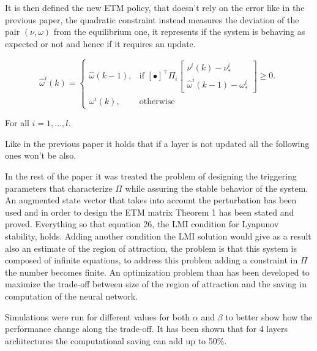 \documentclass[12pt]{article}
\begin{document}
It is then defined the new ETM policy, that doesn't rely on the error like in the previous paper, the quadratic constraint instead measures the deviation of the pair $(\nu, \omega)$ from the equilibrium one, it represents if the system is behaving as expected or not and hence if it requires an update. 

\begin{equation}
  \hat{\omega}^i(k) = \begin{cases}
    \hat{\omega}(k-1), & \text{if } [\bullet ]^{\top} \Pi_i \begin{bmatrix}
      \nu^i(k) - \nu_*^i \\
      \hat{\omega}^i(k-1) - \omega_*^i
    \end{bmatrix} \geq 0.\\
    \omega^i(k), & \text{otherwise}
  \end{cases}
\end{equation}

For all $i=1, \dots, l$.

Like in the previous paper it holds that if a layer is not updated all the following ones won't be also. 

In the rest of the paper it was treated the problem of designing the triggering parameters that characterize $\Pi$ while assuring the stable behavior of the system. An augmented state vector that takes into account the perturbation has been used and in order to design the ETM matrix Theorem 1 has been stated and proved. Everything so that equation 26, the LMI condition for Lyapunov stability, holds. Adding another condition the LMI solution would give as a result also an estimate of the region of attraction, the problem is that this system is composed of infinite equations, to address this problem adding a constraint in $\Pi$ the number becomes finite. An optimization problem than has been developed to maximize the trade-off between size of the region of attraction and the saving in computation of the neural network.

Simulations were run for different values for both $\alpha$ and $\beta$ to better show how the performance change along the trade-off. It has been shown that for 4 layers architectures the computational saving can add up to 50\%.
\end{document}
